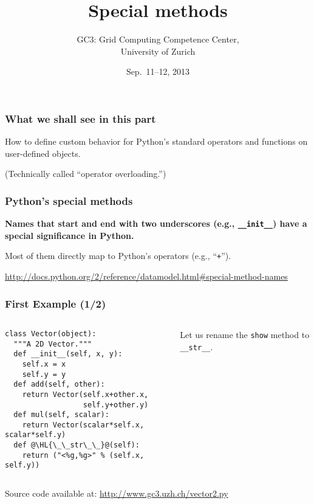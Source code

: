 \documentclass[english,serif,mathserif,xcolor=pdftex,dvipsnames,table]{beamer}
\title[Special methods]{%
  Special methods
}
\author[GC3]{%
  GC3: Grid Computing Competence Center, \\
  University of Zurich
}
\date{Sep.~11--12, 2013}
\begin{document}
\maketitle


\begin{frame}
  \frametitle{What we shall see in this part}

  How to define custom behavior for Python's standard operators and
  functions on user-defined objects.

  \+
  (Technically called ``operator overloading.'')
\end{frame}


\begin{frame}[fragile]
  \frametitle{Python's special methods}

  \textbf{Names that start and end with two underscores (e.g.,
    \lstinline|__init__|) have a special significance in Python.}

  \+ Most of them directly map to Python's operators (e.g.,
  ``\texttt{+}'').

  \+
  \begin{references}
    \url{http://docs.python.org/2/reference/datamodel.html#special-method-names}
  \end{references}
\end{frame}


\begin{frame}[fragile]
  \frametitle{First Example (1/2)}
  \begin{columns}[t]
    \begin{column}{0.5\textwidth}
\begin{lstlisting}
class Vector(object):
  """A 2D Vector."""
  def __init__(self, x, y):
    self.x = x
    self.y = y
  def add(self, other):
    return Vector(self.x+other.x,
                  self.y+other.y)
  def mul(self, scalar):
    return Vector(scalar*self.x, scalar*self.y)
  def @\HL{\_\_str\_\_}@(self):
    return ("<%g,%g>" % (self.x, self.y))
\end{lstlisting}
    \end{column}
    \begin{column}{0.5\textwidth}
      \raggedleft
      Let us rename the \texttt{show} method to \texttt{\_\_str\_\_}.
    \end{column}
  \end{columns}

  \+
  {\scriptsize Source code available at:
    \url{http://www.gc3.uzh.ch/vector2.py}}
\end{frame}
\end{document}
